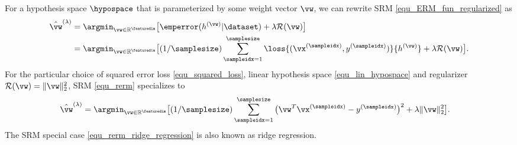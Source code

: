 \documentclass[12pt]{report}
\newcommand{\featurelen}{\featuredim}
\begin{document}
For a hypothesis space $\hypospace$ that is parameterized by some weight vector $\vw$, 
we can rewrite SRM \eqref{equ_ERM_fun_regularized} as 
\begin{align} 
\label{equ_rerm}
\hat{\vw}^{(\lambda)}  & = \argmin_{\vw \in  \mathbb{R}^{\featurelen}} \big[ \emperror(h^{(\vw)}|\dataset)+ \lambda \mathcal{R}(\vw)\big] \nonumber \\ %
&  = \argmin_{\vw \in  \mathbb{R}^{\featurelen}} \big[(1/\samplesize) \sum_{\sampleidx=1}^{\samplesize} \loss{(\vx^{(\sampleidx)},y^{(\sampleidx)})}{h^{(\vw)}} + \lambda \mathcal{R}(\vw) \big]. 
\end{align}
For the particular choice of squared error loss \eqref{equ_squared_loss}, linear hypothesis space \eqref{equ_lin_hypospace} 
and regularizer $\mathcal{R}(\vw)=\| \vw \|_{2}^{2}$, SRM \eqref{equ_rerm} specializes to 
\begin{align} 
\label{equ_rerm_ridge_regression}
\hat{\vw}^{(\lambda)}  & = \argmin_{\vw \in  \mathbb{R}^{\featurelen}} \big[(1/\samplesize) \sum_{\sampleidx=1}^{\samplesize} \big( \vw^{T} \vx^{(\sampleidx)}- y^{(\sampleidx)}\big)^{2} + \lambda \| \vw \|_{2}^{2}\big]. 
\end{align}
The SRM special case \eqref{equ_rerm_ridge_regression} is also known as ridge regression. 





%


\end{document}
